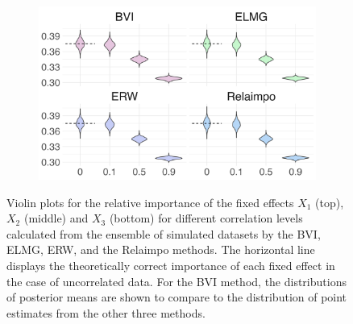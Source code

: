 \begin{figure}[H]
  \begin{subfigure}[b]{0.7\linewidth}
    \centering
    \includegraphics[width=\linewidth]{Figures/ViolinPlots/Variance_V3.png}
    \label{fig:relimp_X3_fig}
  \end{subfigure}
  
  \caption[Relative importance of the fixed effects in Gaussian LMM]{Violin plots for the relative importance of the fixed effects $X_1$ (top), $X_2$ (middle) and $X_3$ (bottom) for different correlation levels calculated from the ensemble of simulated datasets by the BVI, ELMG, ERW, and the Relaimpo methods. The horizontal line displays the theoretically correct importance of each fixed effect in the case of uncorrelated data. For the BVI method, the distributions of posterior means are shown to compare to the distribution of point estimates from the other three methods. }
  \label{fig:relimp_all}
\end{figure}

